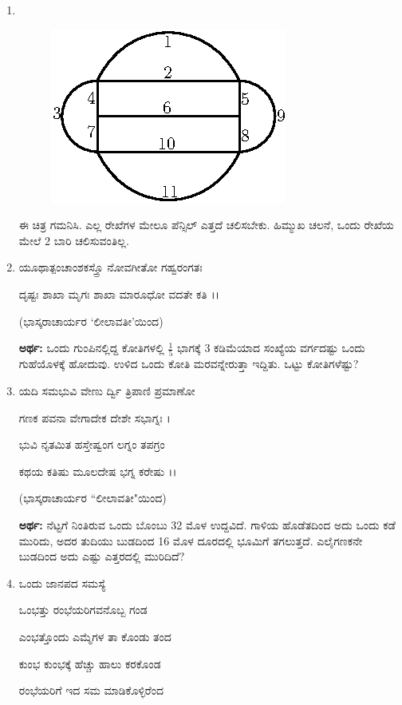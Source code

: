 \begin{enumerate}
\item 
~

\begin{figure}[H]
\centering
\includegraphics{images/chap5/q20.eps}
\end{figure}

ಈ ಚಿತ್ರ ಗಮನಿಸಿ. ಎಲ್ಲ ರೇಖೆಗಳ ಮೇಲೂ ಪೆನ್ಸಿಲ್ ಎತ್ತದೆ ಚಲಿಸಬೇಕು. ಹಿಮ್ಮುಖ ಚಲನೆ, ಒಂದು ರೇಖೆಯ ಮೇಲೆ 2 ಬಾರಿ ಚಲಿಸುವಂತಿಲ್ಲ. 

\item ಯೂಥಾತ್ಪಂಚಾಂಶಕಸ್ತ್ರೊ ನೋವಗೀತೋ ಗಹ್ವರಂಗತಃ 

ದೃಷ್ಟಃ ಶಾಖಾ ಮೃಗಃ ಶಾಖಾ ಮಾರೂಧೋ ವದತೇ ಕತಿ ।।

\smallskip
\hfill (ಭಾಸ್ಕರಾಚಾರ್ಯರ `ಲೀಲಾವತೀ'ಯಿಂದ)

{\bf ಅರ್ಥ:} ಒಂದು ಗುಂಪಿನಲ್ಲಿದ್ದ ಕೋತಿಗಳಲ್ಲಿ $\frac{1}{5}$ ಭಾಗಕ್ಕೆ 3 ಕಡಿಮೆಯಾದ ಸಂಖ್ಯೆಯ ವರ್ಗದಷ್ಟು ಒಂದು ಗುಹೆಯೊಳಕ್ಕೆ ಹೋದುವು. ಉಳಿದ ಒಂದು ಕೋತಿ ಮರವನ್ನೇರುತ್ತಾ ಇದ್ದಿತು. ಒಟ್ಟು ಕೋತಿಗಳೆಷ್ಟು? 

\item ಯದಿ ಸಮಭುವಿ ವೇಣು ರ್ದ್ವಿ ತ್ರಿಪಾಣಿ ಪ್ರಮಾಣೋ 

ಗಣಕ ಪವನಾ ವೇಗಾದೇಕ ದೇಶೇ ಸಭಾಗ್ನಃ ।

ಭುವಿ ನೃತಮಿತ ಹಸ್ತೇಷ್ವಂಗ ಲಗ್ನಂ ತಪಗ್ರಂ 

ಕಥಯ ಕತಿಷು ಮೂಲದೇಷ ಭಗ್ನ ಕರೇಷು ।।

\smallskip
\hfill (ಭಾಸ್ಕರಾಚಾರ್ಯರ ``ಲೀಲಾವತೀ"ಯಿಂದ)

{\bf ಅರ್ಥ:} ನೆಟ್ಟಗೆ ನಿಂತಿರುವ ಒಂದು ಬೊಂಬು 32 ಮೊಳ ಉದ್ದವಿದೆ. ಗಾಳಿಯ ಹೊಡೆತದಿಂದ ಅದು ಒಂದು ಕಡೆ ಮುರಿದು, ಅದರ ತುದಿಯು ಬುಡದಿಂದ 16 ಮೊಳ ದೂರದಲ್ಲಿ ಭೂಮಿಗೆ ತಗಲುತ್ತದೆ. ಎಲೈಗಣಕನೇ ಬುಡದಿಂದ ಅದು ಎಷ್ಟು ಎತ್ತರದಲ್ಲಿ ಮುರಿದಿದೆ? 

\item ಒಂದು ಜಾನಪದ ಸಮಸ್ಯೆ 

ಒಂಭತ್ತು ರಂಭೆಯರಿಗವನೊಬ್ಬ ಗಂಡ 

ಎಂಭತ್ತೊಂದು ಎಮ್ಮೆಗಳ ತಾ ಕೊಂಡು ತಂದ 

ಕುಂಭ ಕುಂಭಕ್ಕೆ ಹೆಚ್ಚು ಹಾಲು ಕರಕೊಂಡ 

ರಂಭೆಯರಿಗೆ ಇದ ಸಮ ಮಾಡಿಕೊಳ್ಳಿರೆಂದ 


\end{enumerate}
